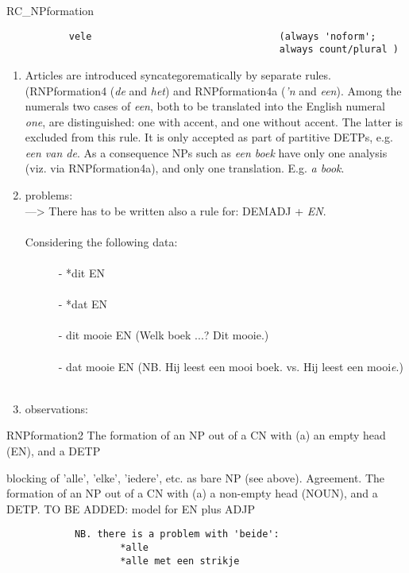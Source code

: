 \begin{mruleclass}{RC_NPformation}
\begin{members}
\begin{member}
\begin{verbatim}
           vele                                 (always 'noform';
                                                always count/plural )
\end{verbatim}
\remarks\mbox{}
\begin{enumerate}
\item  
Articles are introduced syncategorematically by separate rules.
(RNPformation4 ({\em de} and {\em het})  and RNPformation4a ({\em 'n} and 
{\em een}).
Among the numerals two cases of {\em een}, both to be translated into 
the English numeral {\em one},
are distinguished: one with accent, 
and one without accent. The latter is excluded from this rule. It is only 
accepted as part of partitive DETPs, e.g. {\em een van de}.
As a consequence NPs such as {\em een boek} have only one analysis (viz. via 
RNPformation4a), and only 
one translation. E.g. {\em a book}.
\item problems:\\
---> There has to be written also a rule for: DEMADJ + {\em EN}.\\ \\
Considering the following data: \\ \\
\ \ \ \ \ \ - *dit EN \\ \\
\ \ \ \ \ \ - *dat EN \\ \\
\ \ \ \ \ \ -  dit mooie EN (Welk boek ...?  Dit mooie.) \\ \\  
\ \ \ \ \ \ -  dat mooie EN
(NB. Hij leest een mooi boek. vs. Hij leest een mooi{\em e}.) \\ \\           
\item observations:\\

\end{enumerate}

\end{member}
\begin{member}
 RNPformation2
The formation of an NP out of a CN with (a) an empty head (EN), and a DETP

blocking of 'alle', 'elke', 'iedere', etc. 
as bare NP (see above).
Agreement.
The formation of an NP out of a CN with (a) a non-empty head (NOUN), 
and a DETP.
TO BE ADDED: model for EN plus ADJP
\begin{verbatim}
            NB. there is a problem with 'beide':
                    *alle
                    *alle met een strikje
              

\end{verbatim}
\end{member}
\end{members}
\end{mruleclass}
